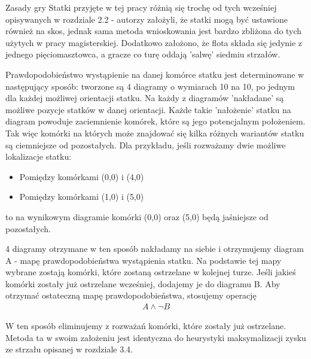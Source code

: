 Zasady gry Statki przyjęte w tej pracy różnią się trochę od tych wcześniej opisywanych w rozdziale 2.2 - autorzy założyli, że statki mogą być ustawione również na skos, jednak sama metoda wnioskowania jest bardzo zbliżona do tych użytych w pracy magisterskiej. Dodatkowo założono, że flota składa się jedynie z jednego pięciomasztowca, a gracze co turę oddają 'salwę' siedmiu strzałów.

Prawdopodobieństwo wystąpienie na danej komórce statku jest determinowane w następujący sposób: tworzone są 4 diagramy o wymiarach 10 na 10, po jednym dla każdej możliwej orientacji statku. Na każdy z diagramów 'nakładane' są możliwe pozycje statków w danej orientacji. Każde takie 'nałożenie' statku na diagram powoduje zaciemnienie komórek, które są jego potencjalnym położeniem. Tak więc komórki na których może znajdować się kilka różnych wariantów statku są ciemniejsze od pozostałych. Dla przykładu, jeśli rozważamy dwie możliwe lokalizacje statku:
\begin{itemize}
    \item Pomiędzy komórkami (0,0) i (4,0)
    \item Pomiędzy komórkami (1,0) i (5,0)
\end{itemize}
to na wynikowym diagramie komórki (0,0) oraz (5,0) będą jaśniejsze od pozostałych.

4 diagramy otrzymane w ten sposób nakładamy na siebie i otrzymujemy diagram A - mapę prawdopodobieństwa wystąpienia statku. Na podstawie tej mapy wybrane zostają komórki, które zostaną ostrzelane w kolejnej turze. Jeśli jakieś komórki zostały już ostrzelane wcześniej, dodajemy je do diagramu B. Aby otrzymać ostateczną mapę prawdopodobieństwa, stosujemy operację
\begin{align*}
    A \land \neg B
\end{align*}

W ten sposób eliminujemy z rozważań komórki, które zostały już ostrzelane. Metoda ta w swoim założeniu jest identyczna do heurystyki maksymalizacji zysku ze strzału opisanej w rozdziale 3.4.

